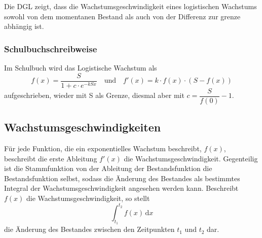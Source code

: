 \documentclass{article}
\begin{document}
\vspace{\baselineskip} \noindent  
Die DGL zeigt, dass die Wachstumsgeschwindigkeit eines logistischen Wachstums sowohl von dem momentanen Bestand als auch von der Differenz zur grenze abhängig ist.
 
\subsubsection{Schulbuchschreibweise}
Im Schulbuch wird das Logistische Wachstum als 
\[
 f(x) = \frac{S}{1 + c \cdot e^{-kSx}}
 \quad \text{und} \quad
 f'(x) = k \cdot f(x) \cdot (S-f(x)) 
\]
aufgeschrieben, wieder mit S als Grenze, diesmal aber mit $c = \dfrac{S}{f(0)}-1$.
 
\subsection{Wachstumsgeschwindigkeiten}
Für jede Funktion, die ein exponentielles Wachstum beschreibt, $f(x)$, beschreibt die erste Ableitung $f'(x)$ die Wachstumsgeschwindigkeit. \newline
Gegenteilig ist die Stammfunktion von der Ableitung der Bestandsfunktion die Bestandsfunktion selbst, sodass die Änderung des Bestandes als bestimmtes Integral der Wachstumsgeschwindigkeit angesehen werden kann. Beschreibt $f(x)$ die Wachstumsgeschwindigkeit, so stellt
\[
 \int_{t_1}^{t_2} f(x) \,\mathrm{d}x 
\]
die Änderung des Bestandes zwischen den Zeitpunkten $t_1$ und $t_2$ dar. 
 
\end{document}
